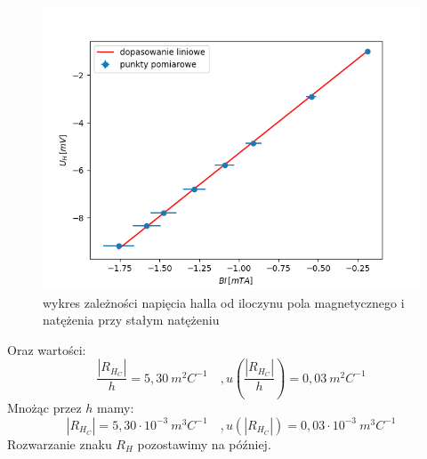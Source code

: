 \documentclass[12pt]{article}
\begin{document}
\begin{figure}[H]
    \centering
    \includegraphics[scale=0.5]{const_current}
    \caption{wykres zależności napięcia halla od iloczynu pola magnetycznego i natężenia przy stałym natężeniu}
    \label{fig:const_current_measuremnts}
\end{figure}
Oraz wartości:
\[
    \frac{|R_{H_C}|}{h} = 5{,}30 \ m^2C^{-1} \quad, u(\frac{|R_{H_C}|}{h}) = 0{,}03 \ m^2C^{-1}  
\]
Mnożąc przez $h$ mamy:
\begin{equation}
    |R_{H_C}| = 5{,}30\cdot10^{-3} \ m^3C^{-1} \quad, u(|R_{H_C}|) = 0{,}03\cdot10^{-3} \ m^3C^{-1}  
    \label{eq:hall_constant_current}
\end{equation}
Rozwarzanie znaku $R_H$ pozostawimy na później.
\end{document}
